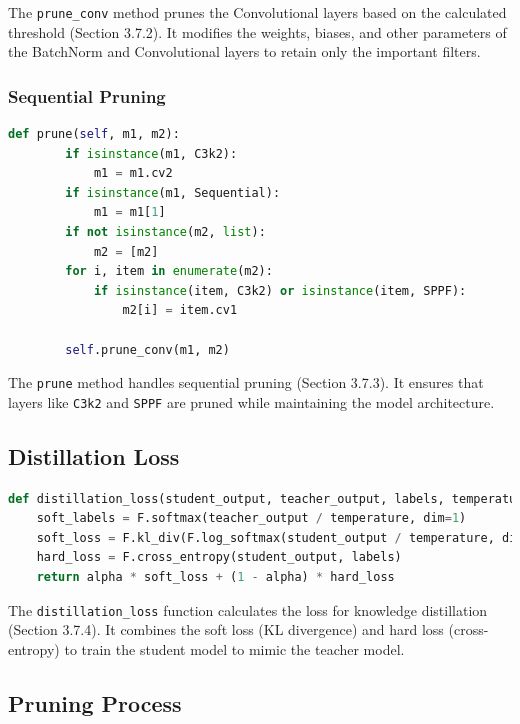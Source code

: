 The \texttt{prune\_conv} method prunes the Convolutional layers based on the calculated threshold (Section 3.7.2). It modifies the weights, biases, and other parameters of the BatchNorm and Convolutional layers to retain only the important filters.

\subsubsection{Sequential Pruning}

\begin{lstlisting}[language=Python]
    def prune(self, m1, m2):
        if isinstance(m1, C3k2):
            m1 = m1.cv2
        if isinstance(m1, Sequential):
            m1 = m1[1]
        if not isinstance(m2, list):
            m2 = [m2]
        for i, item in enumerate(m2):
            if isinstance(item, C3k2) or isinstance(item, SPPF):
                m2[i] = item.cv1

        self.prune_conv(m1, m2)
\end{lstlisting}

The \texttt{prune} method handles sequential pruning (Section 3.7.3). It ensures that layers like \texttt{C3k2} and \texttt{SPPF} are pruned while maintaining the model architecture.

\subsection{Distillation Loss}

\begin{lstlisting}[language=Python]
def distillation_loss(student_output, teacher_output, labels, temperature=3.0, alpha=0.5):
    soft_labels = F.softmax(teacher_output / temperature, dim=1)
    soft_loss = F.kl_div(F.log_softmax(student_output / temperature, dim=1), soft_labels, reduction='batchmean') * (temperature ** 2)
    hard_loss = F.cross_entropy(student_output, labels)
    return alpha * soft_loss + (1 - alpha) * hard_loss
\end{lstlisting}

The \texttt{distillation\_loss} function calculates the loss for knowledge distillation (Section 3.7.4). It combines the soft loss (KL divergence) and hard loss (cross-entropy) to train the student model to mimic the teacher model.

\subsection{Pruning Process}


